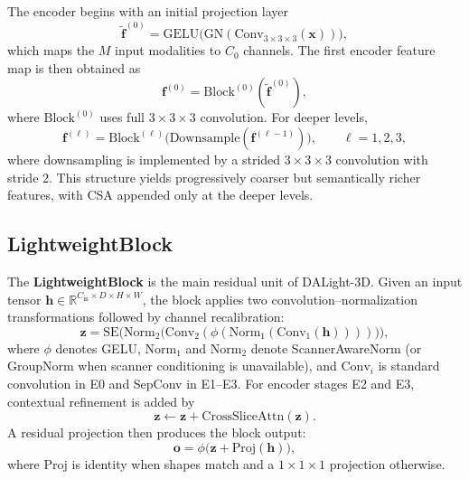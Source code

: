 \documentclass[conference]{IEEEtran}
\begin{document}
The encoder begins with an initial projection layer
\begin{equation}
\tilde{\mathbf{f}}^{(0)} = \mathrm{GELU}\big( \mathrm{GN}( \mathrm{Conv}_{3\times3\times3}(\mathbf{x}) ) \big),
\end{equation}
which maps the $M$ input modalities to $C_0$ channels. The first encoder feature map is then obtained as
\begin{equation}
\mathbf{f}^{(0)} = \mathrm{Block}^{(0)}(\tilde{\mathbf{f}}^{(0)}),
\end{equation}
where $\mathrm{Block}^{(0)}$ uses full $3\times3\times3$ convolution. For deeper levels,
\begin{equation}
\mathbf{f}^{(\ell)} = \mathrm{Block}^{(\ell)}\big( \mathrm{Downsample}(\mathbf{f}^{(\ell-1)}) \big), \qquad \ell = 1,2,3,
\end{equation}
where downsampling is implemented by a strided $3\times3\times3$ convolution with stride $2$. This structure yields progressively coarser but semantically richer features, with CSA appended only at the deeper levels.

\subsection{LightweightBlock}
\label{sec:lightweightblock}

The \textbf{LightweightBlock} is the main residual unit of DALight-3D. Given an input tensor $\mathbf{h} \in \mathbb{R}^{C_{\mathrm{in}} \times D \times H \times W}$, the block applies two convolution--normalization transformations followed by channel recalibration:
\begin{equation}
\mathbf{z} = \mathrm{SE}\!\Big( \mathrm{Norm}_2\big( \mathrm{Conv}_2( \phi( \mathrm{Norm}_1( \mathrm{Conv}_1(\mathbf{h}) ) ) ) \big) \Big),
\end{equation}
where $\phi$ denotes GELU, $\mathrm{Norm}_1$ and $\mathrm{Norm}_2$ denote ScannerAwareNorm (or GroupNorm when scanner conditioning is unavailable), and $\mathrm{Conv}_i$ is standard convolution in E0 and SepConv in E1--E3. For encoder stages E2 and E3, contextual refinement is added by
\begin{equation}
\mathbf{z} \leftarrow \mathbf{z} + \mathrm{CrossSliceAttn}(\mathbf{z}).
\end{equation}
A residual projection then produces the block output:
\begin{equation}
\mathbf{o} = \phi\big(\mathbf{z} + \mathrm{Proj}(\mathbf{h})\big),
\end{equation}
where $\mathrm{Proj}$ is identity when shapes match and a $1\times1\times1$ projection otherwise.
\end{document}
